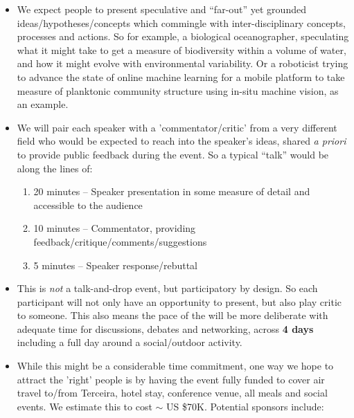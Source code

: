 \documentclass[10pt,letterpaper]{article}
\begin{document}
\begin{itemize}

\item We expect people to present speculative and ``far-out'' yet
  grounded ideas/hypotheses/concepts which commingle with
  inter-disciplinary concepts, processes and actions. So for example,
  a biological oceanographer, speculating what it might take to get a
  measure of biodiversity within a volume of water, and how it might
  evolve with environmental variability. Or a roboticist trying to
  advance the state of online machine learning for a mobile platform
  to take measure of planktonic community structure using in-situ
  machine vision, as an example. 

\item We will pair each speaker with a 'commentator/critic' from a
  very different field who would be expected to reach into the
  speaker's ideas, shared \emph{a priori} to provide public feedback
  during the event. So a typical ``talk'' would be along the lines of:

  \begin{enumerate}

    \item 20 minutes -- Speaker presentation in some measure of
      detail and accessible to the audience
    \item 10 minutes -- Commentator, providing
      feedback/critique/comments/suggestions
    \item 5 minutes -- Speaker response/rebuttal

  \end{enumerate}

\item This is \emph{not} a talk-and-drop event, but participatory by
  design. So each participant will not only have an opportunity to
  present, but also play critic to someone. This also means the pace
  of the \symp will be more deliberate with adequate time for
  discussions, debates and networking, across \textbf{4 days}
  including a full day around a social/outdoor activity.

\item While this might be a considerable time commitment, one way we
  hope to attract the 'right' people is by having the event fully
  funded to cover air travel to/from Terceira, hotel stay, conference
  venue, all meals and social events. We estimate this to cost $\sim$
  US \$70K. Potential sponsors include:

  \begin{itemize}


\end{itemize}
\end{itemize}
\end{document}
